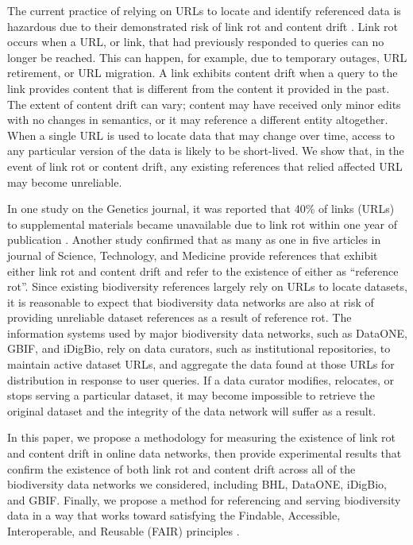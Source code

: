 The current practice of relying on URLs to locate and identify referenced data is hazardous due to their demonstrated risk of link rot and content drift \citep{Klein_2014}. Link rot occurs when a URL, or link, that had previously responded to queries can no longer be reached. This can happen, for example, due to temporary outages, URL retirement, or URL migration. A link exhibits content drift when a query to the link provides content that is different from the content it provided in the past. The extent of content drift can vary; content may have received only minor edits with no changes in semantics, or it may reference a different entity altogether. When a single URL is used to locate data that may change over time, access to any particular version of the data is likely to be short-lived. We show that, in the event of link rot or content drift, any existing references that relied affected URL may become unreliable.

In one study on the Genetics journal, it was reported that 40\% of links (URLs) to supplemental materials became unavailable due to link rot within one year of publication \citep{Vision_2010}. Another study \citep{Klein_2014} confirmed that as many as one in five articles in journal of Science, Technology, and Medicine provide references that exhibit either link rot and content drift and refer to the existence of either as “reference rot”. Since existing biodiversity references largely rely on URLs to locate datasets, it is reasonable to expect that biodiversity data networks are also at risk of providing unreliable dataset references as a result of reference rot. The information systems used by major biodiversity data networks, such as DataONE, GBIF, and iDigBio, rely on data curators, such as institutional repositories, to maintain active dataset URLs, and aggregate the data found at those URLs for distribution in response to user queries. If a data curator modifies, relocates, or stops serving a particular dataset, it may become impossible to retrieve the original dataset and the integrity of the data network will suffer as a result.

In this paper, we propose a methodology for measuring the existence of link rot and content drift in online data networks, then provide experimental results that confirm the existence of both link rot and content drift across all of the biodiversity data networks we considered, including BHL, DataONE, iDigBio, and GBIF. Finally, we propose a method for referencing and serving biodiversity data in a way that works toward satisfying the Findable, Accessible, Interoperable, and Reusable (FAIR) principles \citep{Wilkinson_2016}.

